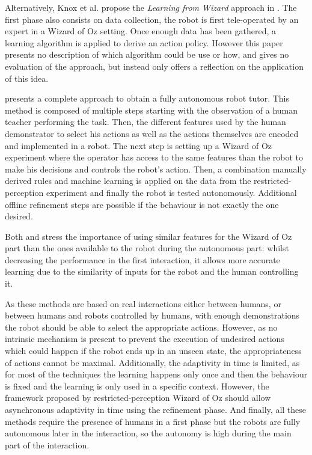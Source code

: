     Alternatively, Knox et al. propose the \emph{Learning from Wizard} approach
    in \citep{knox2014learning}. The first phase also consists on data
    collection, the robot is first tele-operated by an expert in a Wizard of Oz
    setting. Once enough data has been gathered, a learning algorithm is applied
    to derive an action policy. However this paper presents no description of
    which algorithm could be use or how, and gives no evaluation of the
    approach, but instead only offers a reflection on the application of this
    idea.

    \citet{sequeira2016discovering} presents a complete approach to obtain a
    fully autonomous robot tutor. This method is composed of multiple steps
    starting with the observation of a human teacher performing the task. Then,
    the different features used by the human demonstrator to select his actions
    as well as the actions themselves are encoded and implemented in a robot.
    The next step is setting up a Wizard of Oz experiment where the operator has
    access to the same features than the robot to make his decisions and
    controls the robot's action. Then, a combination manually derived rules and
    machine learning is applied on the data from the restricted-perception
    experiment and finally the robot is tested autonomously. Additional offline
    refinement steps are possible if the behaviour is not exactly the one
    desired. 

    Both \citet{knox2014learning} and \citet{sequeira2016discovering} stress the
    importance of using similar features for the Wizard of Oz part than the ones
    available to the robot during the autonomous part: whilst decreasing the
    performance in the first interaction, it allows more accurate learning due
    to the similarity of inputs for the robot and the human controlling it.

    As these methods are based on real interactions either between humans, or
    between humans and robots controlled by humans, with enough demonstrations
    the robot should be able to select the appropriate actions. However, as no
    intrinsic mechanism is present to prevent the execution of undesired actions
    which could happen if the robot ends up in an unseen state, the
    appropriateness of actions cannot be maximal. Additionally, the adaptivity
    in time is limited, as for most of the techniques the learning happens only
    once and then the behaviour is fixed and the learning is only used in a
    specific context. However, the framework proposed by restricted-perception
    Wizard of Oz should allow asynchronous adaptivity in time using the
    refinement phase. And finally, all these methods require the presence of
    humans in a first phase but the robots are fully autonomous later in the
    interaction, so the autonomy is high during the main part of the
    interaction.

